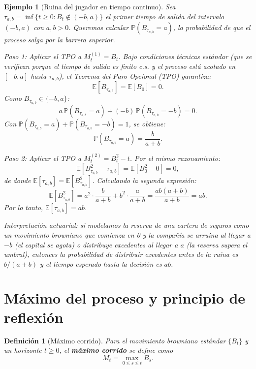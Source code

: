 \documentclass[12pt]{book}
\newtheorem{definition}{Definición}[chapter]
\newtheorem{example}{Ejemplo}[chapter]
\begin{document}
\begin{example}[Ruina del jugador en tiempo continuo]
\label{ex:ruina_continua}
Sea $\tau_{a,b} = \inf\{t \ge 0 : B_t \notin (-b, a)\}$ el primer tiempo de salida del intervalo $(-b, a)$ con $a, b > 0$. Queremos calcular $\mathbb{P}(B_{\tau_{a,b}} = a)$, la probabilidad de que el proceso salga por la barrera superior.

\textit{Paso 1: Aplicar el TPO a $M_t^{(1)} = B_t$.} Bajo condiciones técnicas estándar (que se verifican porque el tiempo de salida es finito c.s. y el proceso está acotado en $[-b, a]$ hasta $\tau_{a,b}$), el Teorema del Paro Opcional (TPO) garantiza:
\[
    \mathbb{E}[B_{\tau_{a,b}}] = \mathbb{E}[B_0] = 0.
\]
Como $B_{\tau_{a,b}} \in \{-b, a\}$:
\[
    a\,\mathbb{P}(B_{\tau_{a,b}} = a) + (-b)\,\mathbb{P}(B_{\tau_{a,b}} = -b) = 0.
\]
Con $\mathbb{P}(B_{\tau_{a,b}} = a) + \mathbb{P}(B_{\tau_{a,b}} = -b) = 1$, se obtiene:
\[
    \boxed{\mathbb{P}(B_{\tau_{a,b}} = a) = \frac{b}{a+b}}.
\]

\textit{Paso 2: Aplicar el TPO a $M_t^{(2)} = B_t^2 - t$.} Por el mismo razonamiento:
\[
    \mathbb{E}[B_{\tau_{a,b}}^2 - \tau_{a,b}] = \mathbb{E}[B_0^2 - 0] = 0,
\]
de donde $\mathbb{E}[\tau_{a,b}] = \mathbb{E}[B_{\tau_{a,b}}^2]$. Calculando la segunda expresión:
\[
    \mathbb{E}[B_{\tau_{a,b}}^2] = a^2 \cdot \frac{b}{a+b} + b^2 \cdot \frac{a}{a+b} = \frac{ab(a+b)}{a+b} = ab.
\]
Por lo tanto, $\mathbb{E}[\tau_{a,b}] = ab$.

Interpretación actuarial: si modelamos la reserva de una cartera de seguros como un movimiento browniano que comienza en 0 y la compañía se arruina al llegar a $-b$ (el capital se agota) o distribuye excedentes al llegar a $a$ (la reserva supera el umbral), entonces la probabilidad de distribuir excedentes antes de la ruina es $b/(a+b)$ y el tiempo esperado hasta la decisión es $ab$.
\end{example}

\section{Máximo del proceso y principio de reflexión}

\begin{definition}[Máximo corrido]
Para el movimiento browniano estándar $\{B_t\}$ y un horizonte $t \ge 0$, el \textbf{máximo corrido} se define como
\[
    M_t = \max_{0 \le s \le t} B_s.
\]
\end{definition}
\end{document}
